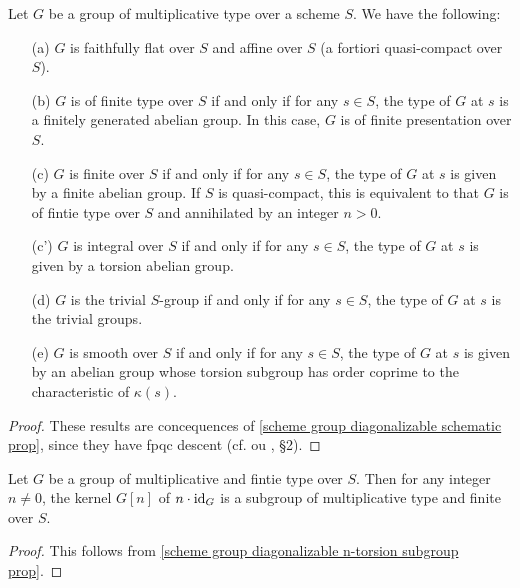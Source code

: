\begin{proposition}\label{scheme group multiplicative schematic prop}
Let $G$ be a group of multiplicative type over a scheme $S$. We have the following:
\begin{enumerate}
    \item[(a)] $G$ is faithfully flat over $S$ and affine over $S$ (a fortiori quasi-compact over $S$).
    \item[(b)] $G$ is of finite type over $S$ if and only if for any $s\in S$, the type of $G$ at $s$ is a finitely generated abelian group. In this case, $G$ is of finite presentation over $S$.
    \item[(c)] $G$ is finite over $S$ if and only if for any $s\in S$, the type of $G$ at $s$ is given by a finite abelian group. If $S$ is quasi-compact, this is equivalent to that $G$ is of fintie type over $S$ and annihilated by an integer $n>0$.
    \item[(c')] $G$ is integral over $S$ if and only if for any $s\in S$, the type of $G$ at $s$ is given by a torsion abelian group.
    \item[(d)] $G$ is the trivial $S$-group if and only if for any $s\in S$, the type of $G$ at $s$ is the trivial groups.
    \item[(e)] $G$ is smooth over $S$ if and only if for any $s\in S$, the type of $G$ at $s$ is given by an abelian group whose torsion subgroup has order coprime to the characteristic of $\kappa(s)$.
\end{enumerate}
\end{proposition}
\begin{proof}
These results are concequences of \cref{scheme group diagonalizable schematic prop}, since they have fpqc descent (cf. \cite{SGA1}  ou \cite{EGA4-2}, \S 2).
\end{proof}

\begin{proposition}\label{scheme group multiplicative n-torsion finite}
Let $G$ be a group of multiplicative and fintie type over $S$. Then for any integer $n\neq 0$, the kernel $G[n]$ of $n\cdot\operatorname{id}_G$ is a subgroup of multiplicative type and finite over $S$.
\end{proposition}
\begin{proof}
This follows from \cref{scheme group diagonalizable n-torsion subgroup prop}.
\end{proof}

